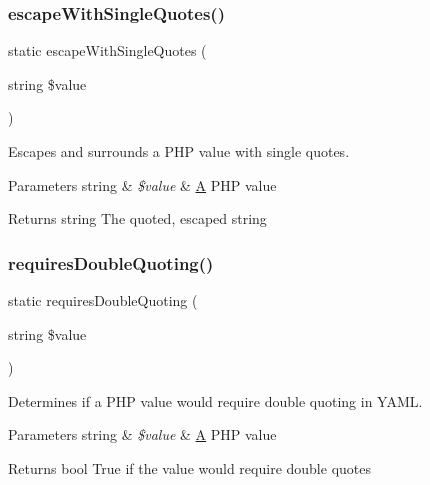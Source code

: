 \subsubsection{\texorpdfstring{escape\+With\+Single\+Quotes()}{escapeWithSingleQuotes()}}
{\footnotesize\ttfamily static escape\+With\+Single\+Quotes (\begin{DoxyParamCaption}\item[{string}]{\$value }\end{DoxyParamCaption})\hspace{0.3cm}{\ttfamily [static]}}

Escapes and surrounds a P\+HP value with single quotes.


\begin{DoxyParams}[1]{Parameters}
string & {\em \$value} & \mbox{\hyperlink{class_a}{A}} P\+HP value\\
\hline
\end{DoxyParams}
\begin{DoxyReturn}{Returns}
string The quoted, escaped string 
\end{DoxyReturn}
\mbox{\label{class_symfony_1_1_component_1_1_yaml_1_1_escaper_a27a91a29f75e7bab19ab1e9d9a571280}} 
\subsubsection{\texorpdfstring{requires\+Double\+Quoting()}{requiresDoubleQuoting()}}
{\footnotesize\ttfamily static requires\+Double\+Quoting (\begin{DoxyParamCaption}\item[{string}]{\$value }\end{DoxyParamCaption})\hspace{0.3cm}{\ttfamily [static]}}

Determines if a P\+HP value would require double quoting in Y\+A\+ML.


\begin{DoxyParams}[1]{Parameters}
string & {\em \$value} & \mbox{\hyperlink{class_a}{A}} P\+HP value\\
\hline
\end{DoxyParams}
\begin{DoxyReturn}{Returns}
bool True if the value would require double quotes 
\end{DoxyReturn}
\mbox{\label{class_symfony_1_1_component_1_1_yaml_1_1_escaper_ad0f9c5f7d3716a41cc182af3129cb88e}} 
